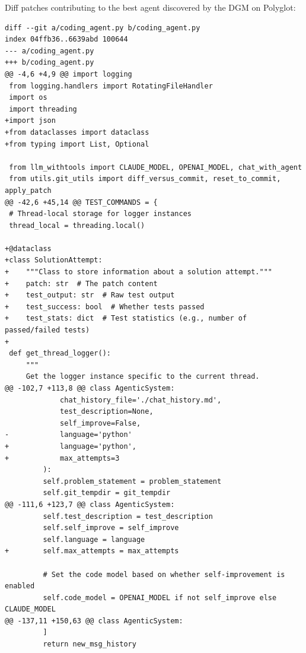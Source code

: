 \documentclass{article} %
\begin{document}
Diff patches contributing to the best agent discovered by the DGM on Polyglot:

\begin{lstlisting}[style=diffstyle]
diff --git a/coding_agent.py b/coding_agent.py
index 04ffb36..6639abd 100644
--- a/coding_agent.py
+++ b/coding_agent.py
@@ -4,6 +4,9 @@ import logging
 from logging.handlers import RotatingFileHandler
 import os
 import threading
+import json
+from dataclasses import dataclass
+from typing import List, Optional
 
 from llm_withtools import CLAUDE_MODEL, OPENAI_MODEL, chat_with_agent
 from utils.git_utils import diff_versus_commit, reset_to_commit, apply_patch
@@ -42,6 +45,14 @@ TEST_COMMANDS = {
 # Thread-local storage for logger instances
 thread_local = threading.local()
 
+@dataclass
+class SolutionAttempt:
+    """Class to store information about a solution attempt."""
+    patch: str  # The patch content
+    test_output: str  # Raw test output
+    test_success: bool  # Whether tests passed
+    test_stats: dict  # Test statistics (e.g., number of passed/failed tests)
+
 def get_thread_logger():
     """
     Get the logger instance specific to the current thread.
@@ -102,7 +113,8 @@ class AgenticSystem:
             chat_history_file='./chat_history.md',
             test_description=None,
             self_improve=False,
-            language='python'
+            language='python',
+            max_attempts=3
         ):
         self.problem_statement = problem_statement
         self.git_tempdir = git_tempdir
@@ -111,6 +123,7 @@ class AgenticSystem:
         self.test_description = test_description
         self.self_improve = self_improve
         self.language = language
+        self.max_attempts = max_attempts
 
         # Set the code model based on whether self-improvement is enabled
         self.code_model = OPENAI_MODEL if not self_improve else CLAUDE_MODEL
@@ -137,11 +150,63 @@ class AgenticSystem:
         ]
         return new_msg_history
 

\end{lstlisting}
\end{document}
